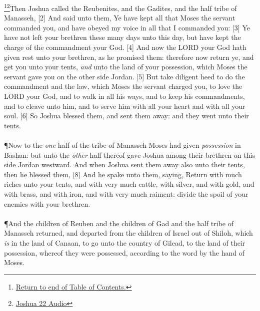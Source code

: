 \footnote{\textcolor[rgb]{0.00,0.25,0.00}{\hyperlink{TOC}{Return to end of Table of Contents.}}}\footnote{\href{https://audiobible.com/bible/joshua_22.html}{\textcolor[cmyk]{0.99998,1,0,0}{Joshua 22 Audio}}}\textcolor[cmyk]{0.99998,1,0,0}{Then Joshua called the Reubenites, and the Gadites, and the half tribe of Manasseh,}
[2] \textcolor[cmyk]{0.99998,1,0,0}{And said unto them, Ye have kept all that Moses the servant  commanded you, and have obeyed my voice in all that I commanded you:}
[3] \textcolor[cmyk]{0.99998,1,0,0}{Ye have not left your brethren these many days unto this day, but have kept the charge of the commandment  your God.}
[4] \textcolor[cmyk]{0.99998,1,0,0}{And now the LORD your God hath given rest unto your brethren, as he promised them: therefore now return ye, and get you unto your tents, \emph{and} unto the land of your possession, which Moses the servant  gave you on the other side Jordan.}
[5] \textcolor[cmyk]{0.99998,1,0,0}{But take diligent heed to do the commandment and the law, which Moses the servant  charged you, to love the LORD your God, and to walk in all his ways, and to keep his commandments, and to cleave unto him, and to serve him with all your heart and with all your soul.}
[6] \textcolor[cmyk]{0.99998,1,0,0}{So Joshua blessed them, and sent them away: and they went unto their tents.}\\
\\
\P \textcolor[cmyk]{0.99998,1,0,0}{Now to the \emph{one} half of the tribe of Manasseh Moses had given \emph{possession} in Bashan: but unto the \emph{other} half thereof gave Joshua among their brethren on this side Jordan westward. And when Joshua sent them away also unto their tents, then he blessed them,}
[8] \textcolor[cmyk]{0.99998,1,0,0}{And he spake unto them, saying, Return with much riches unto your tents, and with very much cattle, with silver, and with gold, and with brass, and with iron, and with very much raiment: divide the spoil of your enemies with your brethren.}\\
\\
\P \textcolor[cmyk]{0.99998,1,0,0}{And the children of Reuben and the children of Gad and the half tribe of Manasseh returned, and departed from the children of Israel out of Shiloh, which \emph{is} in the land of Canaan, to go unto the country of Gilead, to the land of their possession, whereof they were possessed, according to the word  by the hand of Moses.}\\

